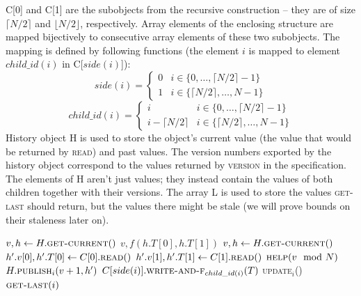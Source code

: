 \documentclass{thesis}
\newcommand{\fn}[1]{\textsc{#1}}
\begin{document}
C[0] and C[1] are the subobjects from the recursive construction -- they are of size $\lceil{}N/2\rceil{}$ and $\lfloor{}N/2\rfloor{}$, respectively. Array elements of the enclosing
structure are mapped bijectively to consecutive array elements of these two subobjects. The mapping is defined by following functions (the element $i$ is mapped to element $child\_id(i)$ in C[$side(i)$]):
\begin{equation*}
side(i) = \begin{cases} 0&i\in\{0,\ldots,\lceil{}N/2\rceil{}-1\}\\1&i\in\{\lceil{}N/2\rceil{},\ldots,N-1\}\end{cases}
\end{equation*}
\begin{equation*}
child\_id(i) = \begin{cases} i&i\in\{0,\ldots,\lceil{}N/2\rceil{}-1\}\\i-\lceil{}N/2\rceil{}&i\in\{\lceil{}N/2\rceil{},\ldots,N-1\}\end{cases}
\end{equation*}
History object H is used to store the object's current value (the value that would be returned by \fn{read}) and past values. The version numbers exported by the history object correspond to the values returned by \fn{version}
in the specification. The elements of H aren't just values; they instead contain the values of both children together with their versions.
The array L is used to store the values \fn{get-last} should return, but the values there might be stale (we will prove bounds on their staleness later on).

\begin{algorithmic}[1]
		\State $v, h \gets H.\fn{get-current}()$ \label{get-getownver}
		\State \Return $v, f(h.T[0], h.T[1])$
	\EndFunction
		\State $v, h \gets H.\fn{get-current}()$ \label{upd-getown}
		\State $h'.v[0], h'.T[0] \gets C[0].\fn{read}()$ \label{upd-getch-0}
		\State $h'.v[1], h'.T[1] \gets C[1].\fn{read}()$ \label{upd-getch-1}
		\State $\fn{help}(v \mod N)$
		\State \Return $H.\fn{publish$_i$}(v+1, h')$ \label{upd-publish}
	\EndFunction
		\State $C[side(i)].\fn{write-and-f$_{child\_id(i)}$}(T)$ \label{upd-chupd}
		\If{\textbf{not} \fn{update$_i$}()} \label{updcall1}
		\State \fn{update$_i$}() \label{updcall2}
		\EndIf
		\State \Return $\fn{get-last}(i)$
	\EndFunction
\end{algorithmic}
\end{document}
